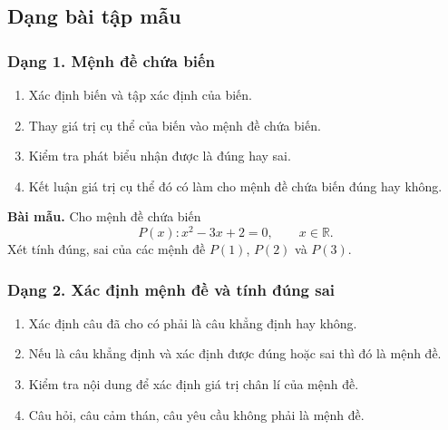 


\subsection{Dạng bài tập mẫu}

\subsubsection{Dạng 1. Mệnh đề chứa biến}

\begin{phuongphap}
\begin{enumerate}
	\item Xác định biến và tập xác định của biến.
	\item Thay giá trị cụ thể của biến vào mệnh đề chứa biến.
	\item Kiểm tra phát biểu nhận được là đúng hay sai.
	\item Kết luận giá trị cụ thể đó có làm cho mệnh đề chứa biến đúng hay không.
\end{enumerate}
\end{phuongphap}

\begin{vidumau}

\textbf{Bài mẫu.} Cho mệnh đề chứa biến
\[
P(x)\colon x^2-3x+2=0,\qquad x\in\mathbb{R}.
\]
Xét tính đúng, sai của các mệnh đề $P(1)$, $P(2)$ và $P(3)$.


\end{vidumau}


\subsubsection{Dạng 2. Xác định mệnh đề và tính đúng sai}

\begin{phuongphap}
\begin{enumerate}
	\item Xác định câu đã cho có phải là câu khẳng định hay không.
	\item Nếu là câu khẳng định và xác định được đúng hoặc sai thì đó là mệnh đề.
	\item Kiểm tra nội dung để xác định giá trị chân lí của mệnh đề.
	\item Câu hỏi, câu cảm thán, câu yêu cầu không phải là mệnh đề.
\end{enumerate}
\end{phuongphap}

